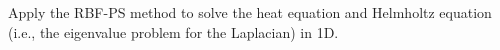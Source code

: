 Apply the RBF-PS method to solve the heat equation and Helmholtz equation (i.e., the eigenvalue problem for the 
Laplacian) in 1D.